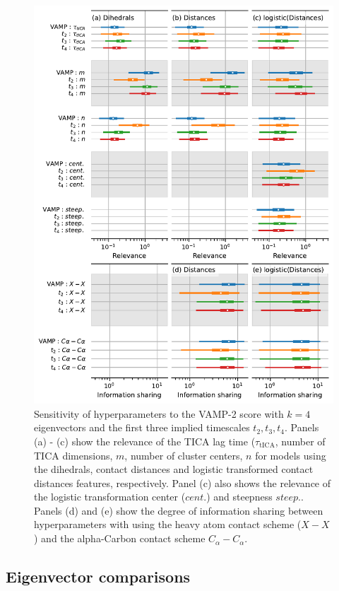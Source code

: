 \documentclass{article}
\begin{document}
\begin{figure}[h]
    \centering
    \includegraphics[height=0.7\textheight]{figures/sensitivities/1fme_sensitivity.pdf}
    \caption{Sensitivity of hyperparameters to the VAMP-2 score with $k=4$ eigenvectors and the first three implied timescales $t_2, t_3, t_4$. Panels (a) - (c) show the relevance of the TICA lag time ($\tau_{\mathrm{tICA}}$, number of TICA dimensions, $m$, number of cluster centers, $n$ for models using the dihedrals, contact distances and logistic transformed contact distances features, respectively. Panel (c) also shows the relevance of the logistic transformation center ($cent.$) and steepness $steep.$.  Panels (d) and (e) show the degree of information sharing between hyperparameters with using the heavy atom contact scheme ($X-X$) and the alpha-Carbon contact scheme $C_{\alpha}-C_{\alpha}$. }
    \label{fig:bba_sensitivity}
\end{figure}

\clearpage
\subsection{Eigenvector comparisons}
\end{document}
